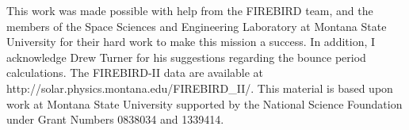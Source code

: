\documentclass[draft,linenumbers]{agujournal}
\begin{document}
%
%
%
%
%
%
%


\acknowledgments
This work was made possible with help from the FIREBIRD team, and the members of the Space Sciences and Engineering Laboratory at Montana State University for their hard work to make this mission a success. In addition, I acknowledge Drew Turner for his suggestions regarding the bounce period calculations. The FIREBIRD-II data are available at http://solar.physics.montana.edu/FIREBIRD\_II/. This material is based upon work at Montana State University supported by the National Science Foundation under Grant Numbers 0838034 and 1339414.








%

%
%
%
%
%
%
%
%
%
%
\end{document}
